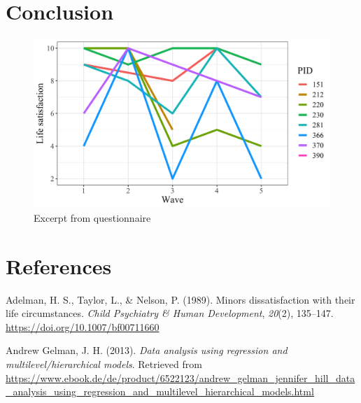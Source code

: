 \documentclass[a4, 12pt]{article}
\begin{document}
\clearpage

\hypertarget{conclusion}{%
\section{Conclusion}\label{conclusion}}

\label{ch:conclusion}

\begin{figure}[H]

{\centering \includegraphics[width=0.8\linewidth,]{../figures/random_lsat} 

}

\caption{Excerpt from questionnaire}\label{fig:random-pid}
\end{figure}

\clearpage

\hypertarget{references}{%
\section*{References}\label{references}}

\singlespacing

\setlength{\parindent}{-0.5in}
\setlength{\leftskip}{0.5in}
\setlength{\parskip}{8pt}

\noindent

\hypertarget{refs}{}
\leavevmode\hypertarget{ref-Adelman1989}{}%
Adelman, H. S., Taylor, L., \& Nelson, P. (1989). Minors dissatisfaction with their life circumstances. \emph{Child Psychiatry \& Human Development}, \emph{20}(2), 135--147. \url{https://doi.org/10.1007/bf00711660}

\leavevmode\hypertarget{ref-AndrewGelman2013}{}%
Andrew Gelman, J. H. (2013). \emph{Data analysis using regression and multilevel/hierarchical models}. Retrieved from \url{https://www.ebook.de/de/product/6522123/andrew_gelman_jennifer_hill_data_analysis_using_regression_and_multilevel_hierarchical_models.html}
\end{document}
